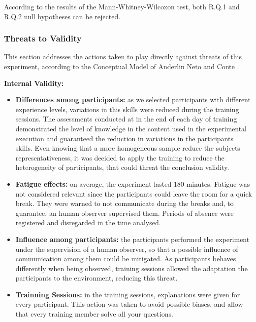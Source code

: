 According to the results of the Mann-Whitney-Wilcoxon test, both R.Q.1 and R.Q.2 null hypotheses can be rejected.

\subsubsection{Threats to Validity}\label{sec:threats}

This section addresses the actions taken to play directly against threats of this experiment, according to the Conceptual Model of Anderlin Neto and Conte \cite{neto13}.

\textbf{Internal Validity:}

\begin{itemize}
\item \textbf{Differences among participants:} as we selected participants with different experience levels, variations in this skills were reduced during the training sessions. The assessments conducted at in the end of each day of training demonstrated the level of knowledge in the content used in the experimental execution and guaranteed the reduction in variations in the participants skills. Even knowing that a more homogeneous sample reduce the subjects representativeness, it was decided to apply the training to reduce the heterogeneity of participants, that could threat the conclusion validity.

\item \textbf{Fatigue effects:} on average, the experiment lasted 180 minutes. Fatigue was not considered relevant since the participants could leave the room for a quick break. They were warned to not communicate during the breaks and, to guarantee, an human observer supervised them. Periods of absence were registered and disregarded in the time analysed.



\item \textbf{Influence among participants:} the participants performed the experiment under the supervision of a human observer, so that a possible influence of communication among them could be mitigated. As participants behaves differently when being observed, training sessions allowed the adaptation the participants to the environment, reducing this threat.

\item \textbf{Trainning Sessions:} in the training sessions, explanations were given for every participant. This action was taken to avoid possible biases, and allow that every training member solve all your questions.
\end{itemize}

